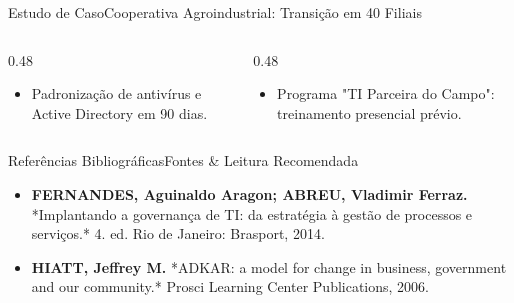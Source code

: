 \begin{senaiframe}{Estudo de Caso}{Cooperativa Agroindustrial: Transição em 40 Filiais}
  \begin{columns}[t]
    \begin{column}{0.48\textwidth}
      \begin{tcolorbox}[senaibluecard, title={Ações da Onda 1}]
        \begin{itemize}
          \item Padronização de antivírus e Active Directory em 90 dias.
        \end{itemize}
      \end{tcolorbox}
    \end{column}
    \begin{column}{0.48\textwidth}
      \begin{tcolorbox}[senaigreencard, title={Engajamento ADKAR}]
        \begin{itemize}
          \item Programa "TI Parceira do Campo": treinamento presencial prévio.
        \end{itemize}
      \end{tcolorbox}
    \end{column}
  \end{columns}
\end{senaiframe}

\begin{senaiframe}{Referências Bibliográficas}{Fontes \& Leitura Recomendada}
  \vspace{0.5cm}
  \begin{tcolorbox}[senaicard, title={Obras de Referência}]
    \begin{itemize}
      \item \textbf{FERNANDES, Aguinaldo Aragon; ABREU, Vladimir Ferraz.} *Implantando a governança de TI: da estratégia à gestão de processos e serviços.* 4. ed. Rio de Janeiro: Brasport, 2014.
      \item \textbf{HIATT, Jeffrey M.} *ADKAR: a model for change in business, government and our community.* Prosci Learning Center Publications, 2006.
    \end{itemize}
  \end{tcolorbox}
\end{senaiframe}

